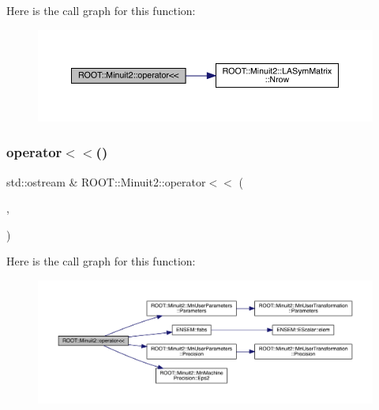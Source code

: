 Here is the call graph for this function\+:
\nopagebreak
\begin{figure}[H]
\begin{center}
\leavevmode
\includegraphics[width=350pt]{d6/d3a/namespaceROOT_1_1Minuit2_a37c2d73b40109f988c5ea59e1edf1f8d_cgraph}
\end{center}
\end{figure}
\mbox{\label{namespaceROOT_1_1Minuit2_a950e1e56f48df042ba519464bda3f1ea}} 
\subsubsection{\texorpdfstring{operator$<$$<$()}{operator<<()}\hspace{0.1cm}{\footnotesize\ttfamily [5/11]}}
{\footnotesize\ttfamily std\+::ostream \& R\+O\+O\+T\+::\+Minuit2\+::operator$<$$<$ (\begin{DoxyParamCaption}\item[{std\+::ostream \&}]{,  }\item[{const \mbox{\hyperlink{classROOT_1_1Minuit2_1_1MnUserParameters}{Mn\+User\+Parameters}} \&}]{ }\end{DoxyParamCaption})}

Here is the call graph for this function\+:
\nopagebreak
\begin{figure}[H]
\begin{center}
\leavevmode
\includegraphics[width=350pt]{d6/d3a/namespaceROOT_1_1Minuit2_a950e1e56f48df042ba519464bda3f1ea_cgraph}
\end{center}
\end{figure}
\mbox{\label{namespaceROOT_1_1Minuit2_ab0d367617b39c46b8b0eeef75ecc5b75}} 
